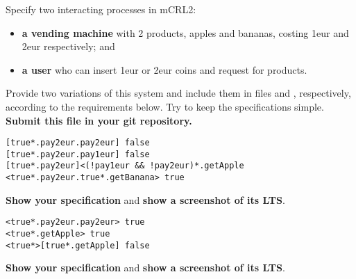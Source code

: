 \documentclass[11pt]{article}
\begin{document}
\begin{myExercise} \label{ex:vm}
Specify two interacting processes in mCRL2:
\begin{itemize}
  \item \textbf{a vending machine} with 2 products, apples and bananas, costing 1eur and 2eur respectively; and
  \item \textbf{a user} who can insert 1eur or 2eur coins and request for products.
\end{itemize}
Provide two variations of this system and include them in files  and , respectively, according to the requirements below. Try to keep the specifications simple. \textbf{Submit this file in your git repository.}

\vspace{-6mm}
\begin{lstlisting}
[true*.pay2eur.pay2eur] false
[true*.pay2eur.pay1eur] false
[true*.pay2eur]<(!pay1eur && !pay2eur)*.getApple
<true*.pay2eur.true*.getBanana> true \end{lstlisting}
\textbf{Show your specification} and \textbf{show a screenshot of its LTS}.

\vspace{2mm}
\vspace{-6mm}
\begin{lstlisting}
<true*.pay2eur.pay2eur> true
<true*.getApple> true
<true*>[true*.getApple] false\end{lstlisting}
\textbf{Show your specification} and \textbf{show a screenshot of its LTS}.

\end{myExercise}


\end{document}
